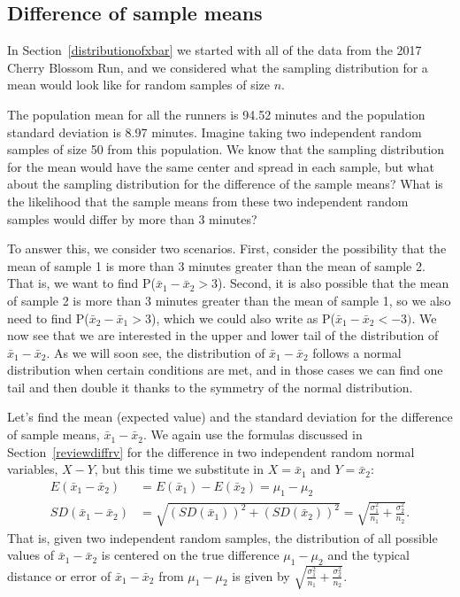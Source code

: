 \subsection{Difference of sample means}
In Section~\ref{distributionofxbar} we started with all of the data from the 2017 Cherry Blossom Run, and we considered what the sampling distribution for a mean would look like for random samples of size $n$.

The population mean for all the runners is 94.52 minutes and the population standard deviation is 8.97 minutes.
Imagine taking two independent random samples of size 50 from this population.
We know that the sampling distribution for the mean would have the same center and spread in each sample, but what about the sampling distribution for the difference of the sample means?
What is the likelihood that the sample means from these two independent random samples would differ by more than 3 minutes?

To answer this, we consider two scenarios.
First, consider the possibility that the mean of sample 1
is more than 3 minutes greater than the mean of sample 2.
That is, we want to find P($\bar{x}_1 - \bar{x}_2 > 3$).
Second, it is also possible that the mean of sample 2 is more than
3 minutes greater than the mean of sample 1, so we also need to
find P($\bar{x}_2 - \bar{x}_1 > 3$), which we could also write as
P($\bar{x}_1 - \bar{x}_2 < -3)$.
We now see that we are interested in the upper and lower tail of
the distribution of $\bar{x}_1 - \bar{x}_2$.
As we will soon see, the distribution of $\bar{x}_1 - \bar{x}_2$
follows a normal distribution when certain conditions are met,
and in those cases we can find one tail and then double it thanks
to the symmetry of the normal distribution.

Let's find the mean (expected value) and the standard deviation for the difference of sample means, $\bar{x}_1 - \bar{x}_2$. We again use the formulas discussed in Section~\ref{reviewdiffrv} for the difference in two independent random normal variables, $X - Y$, but this time we substitute in $X = \bar{x}_1$ and $Y = \bar{x}_2$:
\begin{align*}
E(\bar{x}_1 - \bar{x}_2)
  &= E(\bar{x}_1) - E(\bar{x}_2) = \mu_1 - \mu_2 \\
SD(\bar{x}_1 - \bar{x}_2)
  &= \sqrt{(SD(\bar{x}_1))^2 + (SD(\bar{x}_2))^2}
  =  \sqrt{\frac{\sigma_1^2}{n_1} + \frac{\sigma_2^2}{n_2}}.
\end{align*}
That is, given two independent random samples, the distribution of all possible values of $\bar{x}_1 - \bar{x}_2$ is centered on the true difference $\mu_1-\mu_2$ and the typical distance or error of $\bar{x}_1 - \bar{x}_2$ from $\mu_1-\mu_2$ is given by $\sqrt{\frac{\sigma_1^2}{n_1} + \frac{\sigma_2^2}{n_2}}$.

